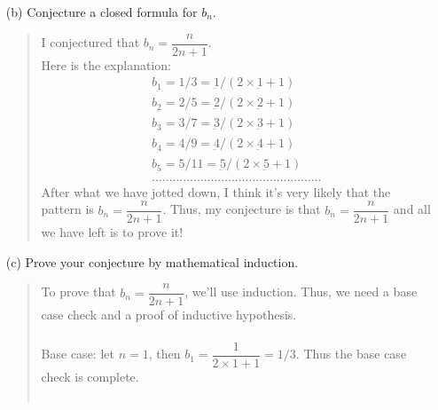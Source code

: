 \documentclass[12pt, a4paper]{article}                      %
\begin{document}
\begin{itemize}
\begin{itemize}
\item[]
\item[]
\item[]

\item[(b)]
Conjecture a closed formula for $b_n$.
\begin{quote}
I conjectured that $b_n = \dfrac{n}{2n + 1}$.\\
Here is the explanation:
\begin{align*}
b_{\underbar 1} = 1/3 = \underbar 1 / (2 \times \underbar 1 + 1)\\
b_{\underbar 2} = 2/5 = \underbar 2 / (2 \times \underbar 2 + 1)\\
b_{\underbar 3} = 3/7 = \underbar 3 / (2 \times \underbar 3 + 1)\\
b_{\underbar 4} = 4/9 = \underbar 4 /(2 \times \underbar 4 + 1)\\
b_{\underbar 5} = 5/11 =  \underbar 5 /(2 \times \underbar 5 + 1)\\
.................................................
\end{align*}
After what we have jotted down, I think it's very likely that the pattern is $b_n = \dfrac{n}{2n + 1}$.
Thus, my conjecture is that $b_n = \dfrac{n}{2n + 1}$ and all we have left is to prove it!
\end{quote}

\item[]

\item[(c)]
Prove your conjecture by mathematical induction.
\begin{quote}
To prove that $b_n = \dfrac{n}{2n + 1}$, we'll use induction. Thus, we need a base case check and a proof of inductive hypothesis.\\\\
Base case: let $n = 1$, then $b_1 = \dfrac{1}{2 \times 1 + 1} = 1/3$. Thus the base case check is complete.\\\\


\end{quote}
\end{itemize}
\end{itemize}
\end{document}
